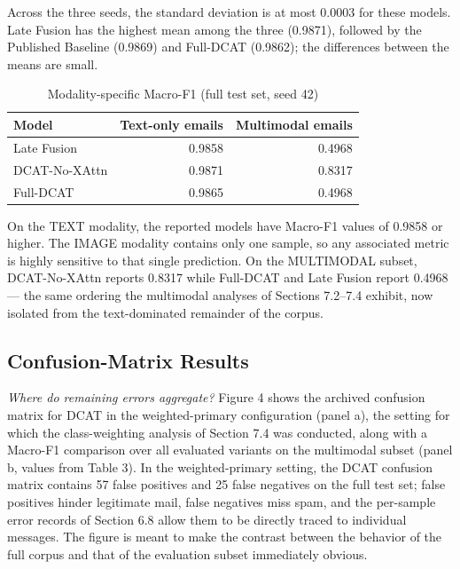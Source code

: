 \documentclass[10pt,twoside]{article}
\begin{document}
Across the three seeds, the standard deviation is at most 0.0003 for these models. Late Fusion has the highest mean among the three (0.9871), followed by the Published Baseline (0.9869) and Full-DCAT (0.9862); the differences between the means are small.

\begin{table}[t]
\centering
\caption{Modality-specific Macro-F1 (full test set, seed 42)}
\label{tab:modality}
\small
\begin{tabular}{lrr}\toprule
Model & Text-only emails & Multimodal emails \\
\midrule
Late Fusion & 0.9858 & 0.4968 \\
DCAT-No-XAttn & 0.9871 & 0.8317 \\
Full-DCAT & 0.9865 & 0.4968 \\
\bottomrule
\end{tabular}

\end{table}

On the TEXT modality, the reported models have Macro-F1 values of 0.9858 or higher. The IMAGE modality contains only one sample, so any associated metric is highly sensitive to that single prediction. On the MULTIMODAL subset, DCAT-No-XAttn reports 0.8317 while Full-DCAT and Late Fusion report 0.4968 --- the same ordering the multimodal analyses of Sections 7.2--7.4 exhibit, now isolated from the text-dominated remainder of the corpus.

\subsection{Confusion-Matrix Results}\label{sec:7.9}

\emph{Where do remaining errors aggregate?} Figure 4 shows the archived confusion matrix for DCAT in the weighted-primary configuration (panel a), the setting for which the class-weighting analysis of Section 7.4 was conducted, along with a Macro-F1 comparison over all evaluated variants on the multimodal subset (panel b, values from Table 3). In the weighted-primary setting, the DCAT confusion matrix contains 57 false positives and 25 false negatives on the full test set; false positives hinder legitimate mail, false negatives miss spam, and the per-sample error records of Section 6.8 allow them to be directly traced to individual messages. The figure is meant to make the contrast between the behavior of the full corpus and that of the evaluation subset immediately obvious.
\end{document}
